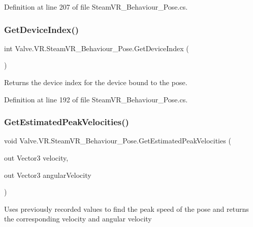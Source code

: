 Definition at line 207 of file Steam\+V\+R\+\_\+\+Behaviour\+\_\+\+Pose.\+cs.

\mbox{\label{class_valve_1_1_v_r_1_1_steam_v_r___behaviour___pose_a045c834f9f876b6eb28c916fe0a4c503}} 
\subsubsection{\texorpdfstring{GetDeviceIndex()}{GetDeviceIndex()}}
{\footnotesize\ttfamily int Valve.\+V\+R.\+Steam\+V\+R\+\_\+\+Behaviour\+\_\+\+Pose.\+Get\+Device\+Index (\begin{DoxyParamCaption}{ }\end{DoxyParamCaption})}



Returns the device index for the device bound to the pose. 



Definition at line 192 of file Steam\+V\+R\+\_\+\+Behaviour\+\_\+\+Pose.\+cs.

\mbox{\label{class_valve_1_1_v_r_1_1_steam_v_r___behaviour___pose_aff9156a545cb6722a73421ac20ebeba9}} 
\subsubsection{\texorpdfstring{GetEstimatedPeakVelocities()}{GetEstimatedPeakVelocities()}}
{\footnotesize\ttfamily void Valve.\+V\+R.\+Steam\+V\+R\+\_\+\+Behaviour\+\_\+\+Pose.\+Get\+Estimated\+Peak\+Velocities (\begin{DoxyParamCaption}\item[{out Vector3}]{velocity,  }\item[{out Vector3}]{angular\+Velocity }\end{DoxyParamCaption})}



Uses previously recorded values to find the peak speed of the pose and returns the corresponding velocity and angular velocity 



